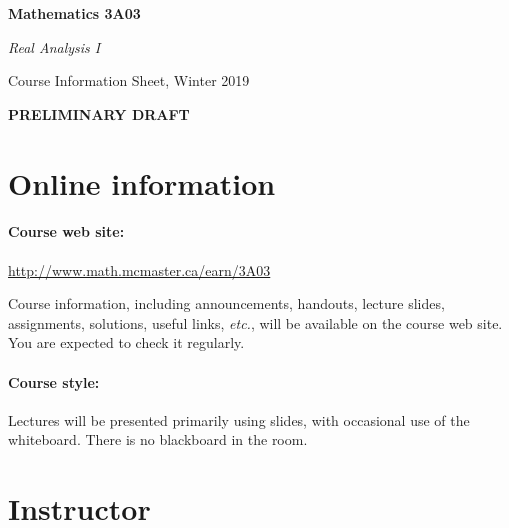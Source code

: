 \documentclass[12pt]{article}
\begin{document}

\vspace{-2cm}

{\Large\parindent=0pt

{\bfseries Mathematics 3A03

{\slshape Real Analysis I}

Course Information Sheet, Winter 2019

{\color{red}\bfseries PRELIMINARY DRAFT}

}}

\bigskip

\noindent

\section*{Online information}

\paragraph*{Course web site:} \url{http://www.math.mcmaster.ca/earn/3A03}

\noindent
Course information, including announcements, handouts, lecture slides,
assignments, solutions, useful links, {\it etc.\/}, will be available
on the course web site.  You are expected to check it regularly.

\paragraph*{Course style:}
Lectures will be presented primarily using slides, with occasional use
of the whiteboard.  There is no blackboard in the room.

\section*{Instructor}
\end{document}
